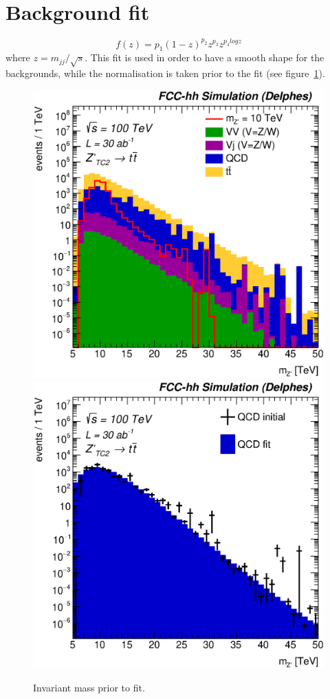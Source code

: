 \documentclass[a4paper,11pt]{article}
\begin{document}
\section{Background fit}
\label{sec:app:bgfit}
\begin{equation}
f(z)=p_1(1-z)^{p_2}z^{p_3}z^{p_{4}logz}
\end{equation}
where $z=m_{jj}/\sqrt{s}$. This fit is used in order to have a smooth shape for the backgrounds, while the normalisation is taken prior to the fit (see figure~\ref{fig:hadronicresonances_nofit}).

\begin{figure}[!htb]\centering
\includegraphics[width=0.45\columnwidth]{Fig/Zptt/Mj1j2_pf08_MetCorr_sel8_nostack_log.eps}
\includegraphics[width=0.45\columnwidth]{Fig/Zptt/Zptt_QCD_sel8_Mj1j2_pf08_MetCorr_fit.eps}
\caption{Invariant mass prior to fit.}
\label{fig:hadronicresonances_nofit}
\end{figure}


\end{document}
